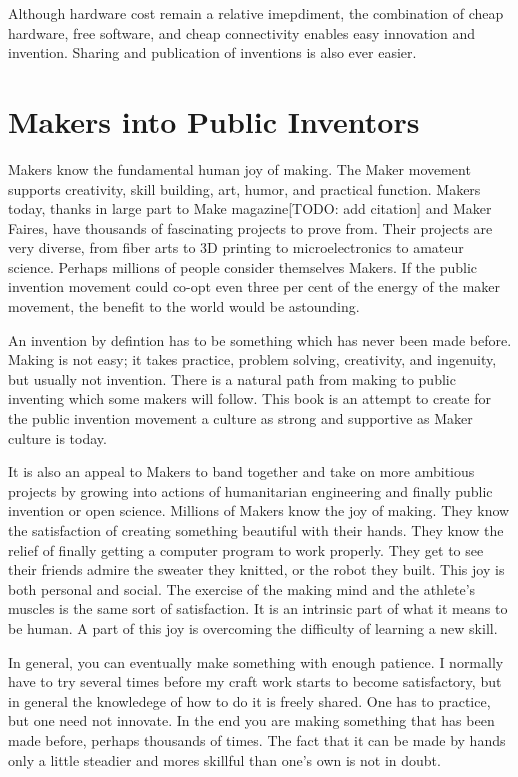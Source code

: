 \documentclass[
	fontsize=10pt, %
	twoside=false, %
	secnumdepth=1, %
]{kaobook}
\begin{document}
Although hardware cost remain a relative imepdiment,
the combination of cheap hardware, free software, and
cheap connectivity enables easy innovation and invention.
Sharing and publication of inventions is also
ever easier.

\section{Makers into Public Inventors}

Makers know the fundamental human joy of making.
The Maker movement supports creativity, skill building,
art, humor, and practical function.
Makers today, thanks in large part to Make magazine[TODO: add citation]
and Maker Faires, have thousands of fascinating
projects to prove from.
Their projects are very diverse, from fiber arts to
3D printing to microelectronics to amateur science.
Perhaps millions of people consider themselves Makers.
If the public invention movement could co-opt even three per cent
of the energy of the maker movement, the benefit to the world would
be astounding.

An invention by defintion has to be something
which has never been made before.
Making is not easy; it takes practice, problem solving, creativity,
and ingenuity, but usually not invention.
There is a natural path from making to
public inventing which some makers will follow.
This book is an attempt to create
for the public invention movement
a culture as strong and supportive as
Maker culture is today.

It is also an appeal to Makers to band together and
take on more ambitious projects by growing into
actions of humanitarian engineering and finally public invention
or open science.
Millions of Makers know the joy of making.
They know the satisfaction of creating something beautiful with
their hands.
They know the relief of finally getting a computer program to work
properly.
They get to see their friends admire the sweater they knitted,
or the robot they built.
This joy is both personal and social.
The exercise of the making mind and the athlete's muscles is
the same sort of satisfaction.
It is an intrinsic part of what it means to be human.
A part of this joy is overcoming the difficulty of learning
a new skill.

In general, you can eventually make something with enough
patience. I normally have to try several times before my
craft work starts to become satisfactory, but in general
the knowledege of how to do it is freely shared.
One has to practice, but one need not innovate.
In the end you are making something that has been made
before, perhaps thousands of times.
The fact that it can be made by hands only a little
steadier and mores skillful than one's own is not in doubt.
\end{document}
